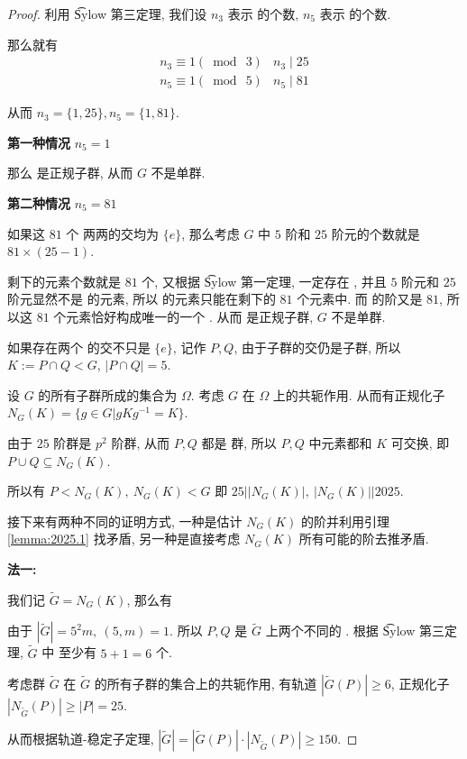 \begin{proof}

利用 \t{Sylow} 第三定理, 我们设 $n_3$ 表示 \Sy[3]的个数, $n_5$ 表示 \Sy[5] 的个数.

那么就有 $$\begin{array}{ll}
	n_3\equiv 1(\bmod\ 3) & n_3\mid 25\\
	n_5\equiv 1(\bmod\ 5) & n_5\mid 81
\end{array}$$

从而 $n_3=\{1,25\},n_5=\{1,81\}$.

\noindent\textbf{第一种情况}  $n_5=1$

那么 \Sy[5]是正规子群, 从而 $G$ 不是单群.

\noindent\textbf{第二种情况} $n_5=81$

如果这 $81$ 个 \Sy[5]两两的交均为 $\{e\}$, 那么考虑 $G$ 中 $5$ 阶和 $25$ 阶元的个数就是 $81\times(25-1)$.

剩下的元素个数就是 $81$ 个, 又根据 \t{Sylow} 第一定理, 一定存在 \Sy[3], 并且 $5$ 阶元和 $25$ 阶元显然不是 \Sy[3]的元素, 所以 \Sy[3]的元素只能在剩下的 $81$ 个元素中. 而 \Sy[3]的阶又是 $81$, 所以这 $81$ 个元素恰好构成唯一的一个 \Sy[3]. 从而 \Sy[3]是正规子群, $G$ 不是单群.

如果存在两个 \Sy[5]的交不只是 $\{e\}$, 记作 $P,Q$, 由于子群的交仍是子群, 所以 $K:=P\cap Q<G$, $|P\cap Q|=5$.

设 $G$ 的所有子群所成的集合为 $\Omega$. 考虑 $G$ 在 $\Omega$ 上的共轭作用. 从而有正规化子 $N_G(K)=\{g\in G|gKg^{-1}=K\}$.

由于 $25$ 阶群是 $p^2$ 阶群, 从而 $P,Q$ 都是 \Abel 群, 所以 $P,Q$ 中元素都和 $K$ 可交换, 即 $P\cup Q\subseteq N_G(K)$.

所以有 $P<N_G(K),\ N_G(K)<G$ 即 $25\big||N_G(K)|,\ |N_G(K)|\big|2025$.

接下来有两种不同的证明方式, 一种是估计 $N_G(K)$ 的阶并利用引理 \ref{lemma:2025.1} 找矛盾, 另一种是直接考虑 $N_G(K)$ 所有可能的阶去推矛盾.

\noindent\textbf{法一:}

我们记 $\widetilde{G}=N_G(K)$, 那么有

由于 $|\widetilde{G}|=5^2m,\ (5,m)=1$. 所以 $P,Q$ 是 $\widetilde{G}$ 上两个不同的 \Sy[5]. 根据 \t{Sylow} 第三定理, $\widetilde{G}$ 中 \Sy[5]至少有 $5+1=6$ 个.

考虑群 $\widetilde{G}$ 在 $\widetilde{G}$ 的所有子群的集合上的共轭作用, 有轨道 $|\widetilde{G}(P)|\geqslant 6$, 正规化子 $|N_{\widetilde{G}}(P)|\geqslant|P|=25$.

从而根据轨道-稳定子定理, $|\widetilde{G}|=|\widetilde{G}(P)|\cdot|N_{\widetilde{G}}(P)|\geqslant 150$.


\end{proof}
